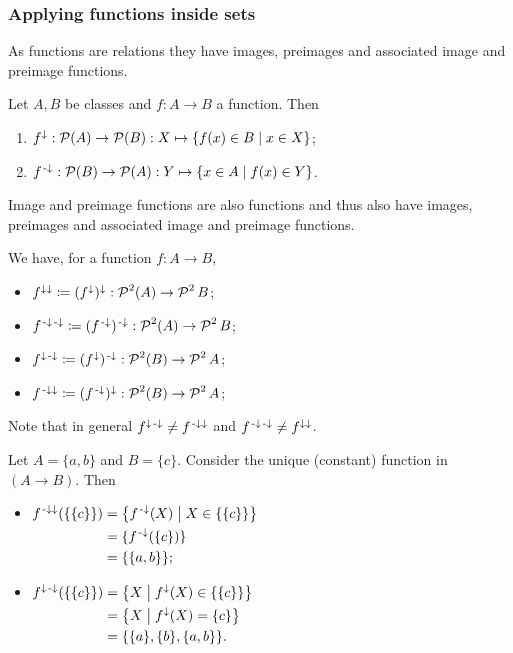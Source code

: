 \subsubsection{Applying functions inside sets}
As functions are relations they have images, preimages and associated image and preimage functions.

\begin{lemma}
Let $A,B$ be classes and $f:A\to B$ a function. Then
\begin{enumerate}
\item $f^{\imf}: \powerset(A) \to \powerset(B): X\mapsto \setbuilder{f(x)\in B}{x\in X}$;
\item $f^{\preimf}: \powerset(B) \to \powerset(A): Y\mapsto \setbuilder{x\in A}{f(x) \in Y}$.
\end{enumerate}
\end{lemma}

Image and preimage functions are also functions and thus also have images, preimages and associated image and preimage functions.

We have, for a function $f:A\to B$,
\begin{itemize}
\item $f^{\imf\imf}\defeq (f^{\imf})^\imf: \powerset^2(A) \to \powerset^2{B}$;
\item $f^{\preimf\preimf}\defeq (f^{\preimf})^\preimf: \powerset^2(A) \to \powerset^2{B}$;
\item $f^{\imf\preimf}\defeq (f^{\imf})^\preimf: \powerset^2(B) \to \powerset^2{A}$;
\item $f^{\preimf\imf}\defeq (f^{\preimf})^\imf: \powerset^2(B) \to \powerset^2{A}$;
\end{itemize}

Note that in general $f^{\imf\preimf} \neq f^{\preimf\imf}$ and $f^{\preimf\preimf} \neq f^{\imf\imf}$.

\begin{example}
Let $A = \{a,b\}$ and $B = \{c\}$. Consider the unique (constant) function in $(A\to B)$. Then
\begin{itemize}
\item $\begin{aligned}[t]
f^{\preimf\imf}(\{\{c\}\}) &= \setbuilder{f^\preimf(X)}{X\in \{\{c\}\}} \\
&= \{f^\preimf(\{c\})\} \\
&= \{\{a,b\}\};
\end{aligned}$
\item $\begin{aligned}[t]
f^{\imf\preimf}(\{\{c\}\}) &= \setbuilder{X}{f^\imf(X)\in \{\{c\}\}} \\
&= \setbuilder{X}{f^\imf(X) = \{c\}} \\
&= \{ \{a\}, \{b\}, \{a,b\} \}.
\end{aligned}$
\end{itemize}
\end{example}

